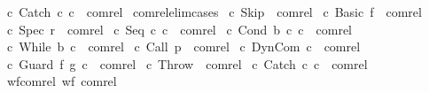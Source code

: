 \begin{isabellebody}
{\isacharbar}\ {\isachardoublequoteopen}{\isacharparenleft}c{}{\isacharcomma}\ Catch\ c{}\ c{}{\isacharparenright}\ {\isasymin}\ com{\isacharunderscore}rel{\isachardoublequoteclose}\isanewline
\isanewline
{}\isamarkupfalse%
\ com{\isacharunderscore}rel{\isacharunderscore}elim{\isacharunderscore}cases{\isacharcolon}\isanewline
\ {\isachardoublequoteopen}{\isacharparenleft}c{\isacharcomma}\ Skip{\isacharparenright}\ {\isasymin}\ com{\isacharunderscore}rel{\isachardoublequoteclose}\isanewline
\ {\isachardoublequoteopen}{\isacharparenleft}c{\isacharcomma}\ Basic\ f{\isacharparenright}\ {\isasymin}\ com{\isacharunderscore}rel{\isachardoublequoteclose}\isanewline
\ {\isachardoublequoteopen}{\isacharparenleft}c{\isacharcomma}\ Spec\ r{\isacharparenright}\ {\isasymin}\ com{\isacharunderscore}rel{\isachardoublequoteclose}\isanewline
\ {\isachardoublequoteopen}{\isacharparenleft}c{\isacharcomma}\ Seq\ c{}\ c{}{\isacharparenright}\ {\isasymin}\ com{\isacharunderscore}rel{\isachardoublequoteclose}\isanewline
\ {\isachardoublequoteopen}{\isacharparenleft}c{\isacharcomma}\ Cond\ b\ c{}\ c{}{\isacharparenright}\ {\isasymin}\ com{\isacharunderscore}rel{\isachardoublequoteclose}\isanewline
\ {\isachardoublequoteopen}{\isacharparenleft}c{\isacharcomma}\ While\ b\ c{}{\isacharparenright}\ {\isasymin}\ com{\isacharunderscore}rel{\isachardoublequoteclose}\isanewline
\ {\isachardoublequoteopen}{\isacharparenleft}c{\isacharcomma}\ Call\ p{\isacharparenright}\ {\isasymin}\ com{\isacharunderscore}rel{\isachardoublequoteclose}\isanewline
\ {\isachardoublequoteopen}{\isacharparenleft}c{\isacharcomma}\ DynCom\ c{}{\isacharparenright}\ {\isasymin}\ com{\isacharunderscore}rel{\isachardoublequoteclose}\isanewline
\ {\isachardoublequoteopen}{\isacharparenleft}c{\isacharcomma}\ Guard\ f\ g\ c{}{\isacharparenright}\ {\isasymin}\ com{\isacharunderscore}rel{\isachardoublequoteclose}\isanewline
\ {\isachardoublequoteopen}{\isacharparenleft}c{\isacharcomma}\ Throw{\isacharparenright}\ {\isasymin}\ com{\isacharunderscore}rel{\isachardoublequoteclose}\isanewline
\ {\isachardoublequoteopen}{\isacharparenleft}c{\isacharcomma}\ Catch\ c{}\ c{}{\isacharparenright}\ {\isasymin}\ com{\isacharunderscore}rel{\isachardoublequoteclose}\isanewline
\isanewline
{}\isamarkupfalse%
\ wf{\isacharunderscore}com{\isacharunderscore}rel{\isacharcolon}\ {\isachardoublequoteopen}wf\ com{\isacharunderscore}rel{\isachardoublequoteclose}\isanewline

\end{isabellebody}
